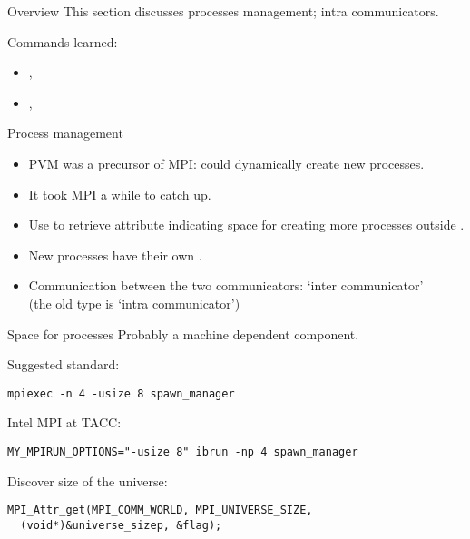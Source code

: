 
\begin{numberedframe}{Overview}
  This section discusses processes management; intra communicators.

  Commands learned:
  \begin{itemize}
  \item {}, 
  \item {}, 
  \end{itemize}
\end{numberedframe}

\begin{numberedframe}{Process management}
  \begin{itemize}
  \item PVM was a precursor of MPI: could dynamically create new
    processes.
  \item It took MPI a while to catch up.
  \item Use  to retrieve
     attribute indicating space for
    creating more processes outside .
  \item New processes have their own .
  \item Communication between the two communicators: `inter
    communicator'\\ (the old type is `intra communicator')
  \end{itemize}
\end{numberedframe}

\begin{numberedframe}{Space for processes}
  Probably a machine dependent component.

  Suggested standard:
\begin{verbatim}
mpiexec -n 4 -usize 8 spawn_manager
\end{verbatim}

  Intel MPI at TACC:
\begin{verbatim}
MY_MPIRUN_OPTIONS="-usize 8" ibrun -np 4 spawn_manager
\end{verbatim}
Discover size of the universe:
\begin{lstlisting}
MPI_Attr_get(MPI_COMM_WORLD, MPI_UNIVERSE_SIZE,
  (void*)&universe_sizep, &flag);
\end{lstlisting}
\end{numberedframe}

